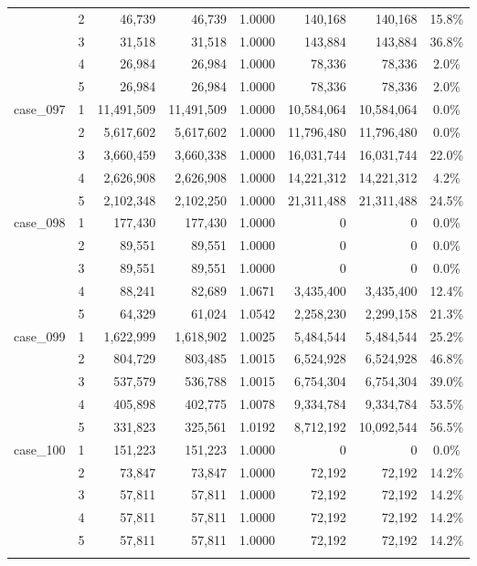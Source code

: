 \begin{footnotesize}
\begin{longtable}{l c rr c rr c}
 & 2 & 46{,}739 & 46{,}739 & 1.0000 & 140{,}168 & 140{,}168 & 15.8\% \\
 & 3 & 31{,}518 & 31{,}518 & 1.0000 & 143{,}884 & 143{,}884 & 36.8\% \\
 & 4 & 26{,}984 & 26{,}984 & 1.0000 & 78{,}336 & 78{,}336 & 2.0\% \\
 & 5 & 26{,}984 & 26{,}984 & 1.0000 & 78{,}336 & 78{,}336 & 2.0\% \\
\addlinespace[2pt]
case\_097 & 1 & 11{,}491{,}509 & 11{,}491{,}509 & 1.0000 & 10{,}584{,}064 & 10{,}584{,}064 & 0.0\% \\
 & 2 & 5{,}617{,}602 & 5{,}617{,}602 & 1.0000 & 11{,}796{,}480 & 11{,}796{,}480 & 0.0\% \\
 & 3 & 3{,}660{,}459 & 3{,}660{,}338 & 1.0000 & 16{,}031{,}744 & 16{,}031{,}744 & 22.0\% \\
 & 4 & 2{,}626{,}908 & 2{,}626{,}908 & 1.0000 & 14{,}221{,}312 & 14{,}221{,}312 & 4.2\% \\
 & 5 & 2{,}102{,}348 & 2{,}102{,}250 & 1.0000 & 21{,}311{,}488 & 21{,}311{,}488 & 24.5\% \\
\addlinespace[2pt]
case\_098 & 1 & 177{,}430 & 177{,}430 & 1.0000 & 0 & 0 & 0.0\% \\
 & 2 & 89{,}551 & 89{,}551 & 1.0000 & 0 & 0 & 0.0\% \\
 & 3 & 89{,}551 & 89{,}551 & 1.0000 & 0 & 0 & 0.0\% \\
 & 4 & 88{,}241 & 82{,}689 & 1.0671 & 3{,}435{,}400 & 3{,}435{,}400 & 12.4\% \\
 & 5 & 64{,}329 & 61{,}024 & 1.0542 & 2{,}258{,}230 & 2{,}299{,}158 & 21.3\% \\
\addlinespace[2pt]
case\_099 & 1 & 1{,}622{,}999 & 1{,}618{,}902 & 1.0025 & 5{,}484{,}544 & 5{,}484{,}544 & 25.2\% \\
 & 2 & 804{,}729 & 803{,}485 & 1.0015 & 6{,}524{,}928 & 6{,}524{,}928 & 46.8\% \\
 & 3 & 537{,}579 & 536{,}788 & 1.0015 & 6{,}754{,}304 & 6{,}754{,}304 & 39.0\% \\
 & 4 & 405{,}898 & 402{,}775 & 1.0078 & 9{,}334{,}784 & 9{,}334{,}784 & 53.5\% \\
 & 5 & 331{,}823 & 325{,}561 & 1.0192 & 8{,}712{,}192 & 10{,}092{,}544 & 56.5\% \\
\addlinespace[2pt]
case\_100 & 1 & 151{,}223 & 151{,}223 & 1.0000 & 0 & 0 & 0.0\% \\
 & 2 & 73{,}847 & 73{,}847 & 1.0000 & 72{,}192 & 72{,}192 & 14.2\% \\
 & 3 & 57{,}811 & 57{,}811 & 1.0000 & 72{,}192 & 72{,}192 & 14.2\% \\
 & 4 & 57{,}811 & 57{,}811 & 1.0000 & 72{,}192 & 72{,}192 & 14.2\% \\
 & 5 & 57{,}811 & 57{,}811 & 1.0000 & 72{,}192 & 72{,}192 & 14.2\% \\
\addlinespace[2pt]
\end{longtable}
\end{footnotesize}
